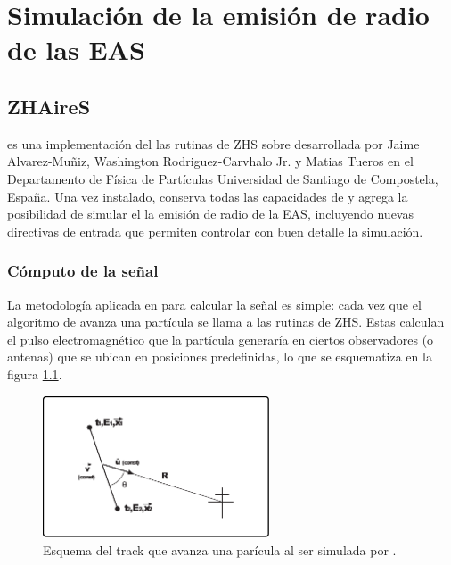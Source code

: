 \chapter{Simulaci\'on de la emisi\'on de radio de las EAS}
\label{ch:simulacionRadio}

\section{ZHAireS}

\zhs{} es una implementaci\'on del las rutinas de ZHS \cite{1_halzen_zas_stanev_1991,2_zas_halzen_stanev_1992} sobre \aires{} desarrollada por Jaime Alvarez-Muñiz, Washington Rodriguez-Carvhalo Jr. y Matias Tueros en el Departamento de Física de Partículas Universidad de Santiago de Compostela, España.
Una vez instalado, \zhs{} conserva todas las capacidades de \aires{} y agrega la posibilidad de simular el la emisi\'on de radio de la EAS, incluyendo nuevas directivas de entrada que permiten controlar con buen detalle la simulación.

	\subsection{C\'omputo de la se\~nal}
	
	La metodolog\'ia aplicada en \zhs{} para calcular la se\~nal es simple: cada vez que el algoritmo de \aires{} avanza una part\'icula se llama a las rutinas de ZHS.
	Estas calculan el pulso electromagn\'etico que la partícula generar\'ia en ciertos observadores (o antenas) que se ubican en posiciones predefinidas, lo que se esquematiza en la figura \ref{fig:trackSch}.
	\begin{figure}[ht!]
	\centering
		\includegraphics[width=0.6\textwidth]{fig/simulacionRadio/trackSch}
		\caption{\label{fig:trackSch} Esquema del track que avanza una par\'icula al ser simulada por \aires{}.}
	\end{figure}
	
